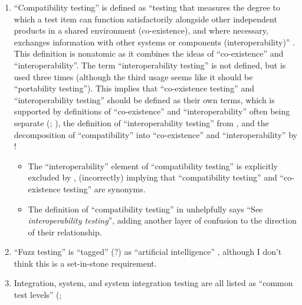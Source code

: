 \begin{enumerate}
      \item ``Compatibility testing'' is defined as ``testing that measures the
            degree to which a test item can function satisfactorily alongside
            other independent products in a shared environment (co-existence),
            and where necessary, exchanges information with other systems or
            components (interoperability)'' \citep[p.~3]{IEEE2022}. This
            definition is nonatomic as it combines the ideas of ``co-existence''
            and ``interoperability''. The term ``interoperability testing'' is
            not defined, but is used three times \citep[pp.~22,~43]{IEEE2022}
            (although the third usage seems like it should be ``portability
            testing''). This implies that ``co-existence testing'' and
            ``interoperability testing'' should be defined as their own terms,
            which is supported by definitions of ``co-existence'' and
            ``interoperability'' often being separate (\citealpISTQB{};
            \citealp[pp.~73,~237]{IEEE2017}), the definition of
            ``interoperability testing'' from \citet[p.~238]{IEEE2017},
            and the decomposition of ``compatibility'' into ``co-existence''
            and ``interoperability'' by \citet{ISO_IEC2023a}!
            \begin{itemize}
                  \item The ``interoperability'' element of ``compatibility
                        testing'' is explicitly excluded by
                        \citet[p.~37]{IEEE2021}, (incorrectly) implying that
                        ``compatibility testing'' and ``co-existence testing''
                        are synonyms.
                  \item The definition of ``compatibility testing'' in
                        \citep[p.~43]{Kam2008} unhelpfully says ``See
                        \emph{interoperability testing}'', adding another
                        layer of confusion to the direction of their
                        relationship.
            \end{itemize}
      \item ``Fuzz testing'' is ``tagged'' (?) as ``artificial intelligence''
            \citep[p.~5]{IEEE2022}, although I don't think this is a
            set-in-stone requirement.
      \item Integration, system, and system integration testing are all listed
            as ``common test levels'' (\citealp[p.~12]{IEEE2022};

\end{enumerate}

